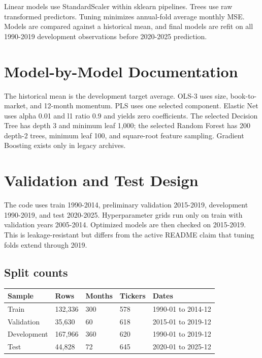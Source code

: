 \documentclass[
  11pt,
  a4paper]{article}
\newcounter{none} %
\begin{document}
Linear models use StandardScaler within sklearn pipelines. Trees use raw
transformed predictors. Tuning minimizes annual-fold average monthly
MSE. Models are compared against a historical mean, and final models are
refit on all 1990-2019 development observations before 2020-2025
prediction.

\section{Model-by-Model Documentation}\label{sec-10}

The historical mean is the development target average. OLS-3 uses size,
book-to-market, and 12-month momentum. PLS uses one selected component.
Elastic Net uses alpha 0.01 and l1 ratio 0.9 and yields zero
coefficients. The selected Decision Tree has depth 3 and minimum leaf
1,000; the selected Random Forest has 200 depth-2 trees, minimum leaf
100, and square-root feature sampling. Gradient Boosting exists only in
legacy archives.

\section{Validation and Test Design}\label{sec-11}

The code uses train 1990-2014, preliminary validation 2015-2019,
development 1990-2019, and test 2020-2025. Hyperparameter grids run only
on train with validation years 2005-2014. Optimized models are then
checked on 2015-2019. This is leakage-resistant but differs from the
active README claim that tuning folds extend through 2019.

\subsection{Split counts}\label{sec-split-counts}

{\def\LTcaptype{none} %
\begin{longtable}[]{@{}lllll@{}}
\toprule\noalign{}
Sample & Rows & Months & Tickers & Dates \\
\midrule\noalign{}
\endhead
\bottomrule\noalign{}
\endlastfoot
Train & 132,336 & 300 & 578 & 1990-01 to 2014-12 \\
Validation & 35,630 & 60 & 618 & 2015-01 to 2019-12 \\
Development & 167,966 & 360 & 620 & 1990-01 to 2019-12 \\
Test & 44,828 & 72 & 645 & 2020-01 to 2025-12 \\
\end{longtable}
}
\end{document}
